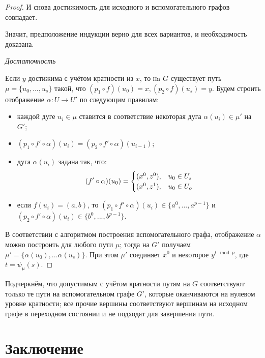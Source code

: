 \begin{proof}
	И снова достижимость для исходного и вспомогательного графов совпадает. 
	
	Значит, предположение индукции верно для всех вариантов, и необходимость доказана.
	
	\textit {Достаточность}
	
	Если $y$ достижима с учётом кратности из $x$, то нa $G$ существует путь $\mu = \{u_0, ... , u_s\}$ такой, что $(p_1 \circ f)(u_0) = x, (p_2 \circ f)(u_s) = y$. Будем строить отображение $\alpha:U\to U'$ по следующим правилам:
	
	\begin{itemize}
		\item каждой дуге $u_i \in \mu$ ставится в соответствие некоторая дуга $\alpha(u_i) \in \mu'$ на $G'$;
		\item $(p_1 \circ f' \circ \alpha)(u_i) = (p_2 \circ f' \circ \alpha)(u_{i-1})$;
		\item дуга $\alpha(u_i)$ задана так, что: 
		\begin{equation*}
		(f' \circ \alpha)(u_0) =
		\begin{cases}
		(x^0, z^0), &\text{$ u_0 \in U_s$}\\
		(x^0, z^1), &\text{$ u_0 \in U_o$}
		\end{cases}
		\end{equation*} 
		
		\item если $f(u_i) = (a, b)$, то $(p_1 \circ f' \circ \alpha)(u_i) \in \{a^0, ... , a^{p-1}\}$ и $(p_2 \circ f' \circ \alpha)(u_i) \in \{b^0, ... , b^{p-1}\}$.
	\end{itemize}
	
	В соответствии с алгоритмом построения вспомогательного графа, отображение $\alpha$ можно построить для любого пути $\mu$; тогда на $G'$ получаем $\mu' = \{\alpha(u_0), ...  \alpha(u_s)\}$. При этом $\mu'$ соединяет $x^0$ и некоторое $y^{t \mod p}$, где $t = \psi_\mu(s)$.
\end{proof}

Подчеркнём, что допустимым с учётом кратности путям на $G$ соответствуют только те пути на вспомогательном графе $G'$, которые оканчиваются на нулевом уровне кратности; все прочие вершины соответствуют вершинам на исходном графе в переходном состоянии и не подходят для завершения пути.  

\section{Заключение}


